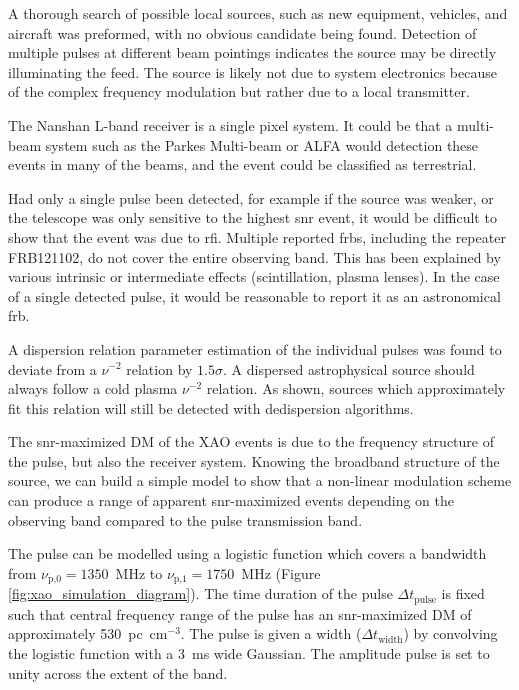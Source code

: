 \documentclass[a4paper,fleqn,usenatbib]{mnras}
\begin{document}
A thorough search of possible local sources, such as new equipment, vehicles,
and aircraft was preformed, with no obvious candidate being found. Detection of
multiple pulses at different beam pointings indicates the source may be directly
illuminating the feed. The source is likely not due to system electronics
because of the complex frequency modulation but rather due to a local
transmitter.

The Nanshan L-band receiver is a single pixel system. It could be
that a multi-beam system such as the Parkes Multi-beam or ALFA would detection
these events in many of the beams, and the event could be classified as
terrestrial.

Had only a single pulse been detected, for example if the source was weaker, or
the telescope was only sensitive to the highest \gls{snr} event, it would be
difficult to show that the event was due to \gls{rfi}.  Multiple reported
\glspl{frb}, including the repeater FRB121102, do not cover the entire observing
band. This has been explained by various intrinsic or intermediate effects
(scintillation, plasma lenses). In the case of a single detected pulse, it would
be reasonable to report it as an astronomical \gls{frb}.

A dispersion relation parameter estimation of the individual pulses was found to
deviate from a $\nu^{-2}$ relation by $1.5 \sigma$. A dispersed astrophysical
source should always follow a cold plasma $\nu^{-2}$ relation. As shown, sources
which approximately fit this relation will still be detected with dedispersion
algorithms.

The \gls{snr}-maximized DM of the XAO events is due to the frequency structure
of the pulse, but also the receiver system.  Knowing the broadband structure of
the source, we can build a simple model to show that a non-linear modulation
scheme can produce a range of apparent \gls{snr}-maximized events depending on
the observing band compared to the pulse transmission band.

The pulse can be modelled using a logistic function which covers a bandwidth from
$\nu_{\textrm{p,0}} = 1350$~MHz to $\nu_{\textrm{p,1}} = 1750$~MHz (Figure
\ref{fig:xao_simulation_diagram}). The time duration of the pulse $\Delta
t_{\textrm{pulse}}$ is fixed such that central frequency range of the pulse has
an \gls{snr}-maximized DM of approximately 530~pc~cm$^{-3}$. The pulse is given
a width ($\Delta t_{\textrm{width}}$) by convolving the logistic function with a
3~ms wide Gaussian. The amplitude pulse is set to unity across the extent of the
band.
\end{document}
